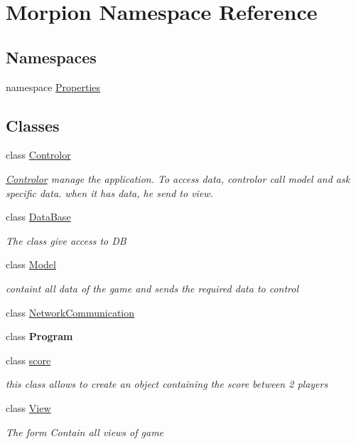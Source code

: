 \hypertarget{namespace_morpion}{}\section{Morpion Namespace Reference}
\label{namespace_morpion}
\subsection*{Namespaces}
\begin{DoxyCompactItemize}
\item 
namespace \hyperlink{namespace_morpion_1_1_properties}{Properties}
\end{DoxyCompactItemize}
\subsection*{Classes}
\begin{DoxyCompactItemize}
\item 
class \hyperlink{class_morpion_1_1_controlor}{Controlor}
\begin{DoxyCompactList}\small\item\em \hyperlink{class_morpion_1_1_controlor}{Controlor} manage the application. To access data, controlor call model and ask specific data. when it has data, he send to view. \end{DoxyCompactList}\item 
class \hyperlink{class_morpion_1_1_data_base}{Data\+Base}
\begin{DoxyCompactList}\small\item\em The class give access to DB \end{DoxyCompactList}\item 
class \hyperlink{class_morpion_1_1_model}{Model}
\begin{DoxyCompactList}\small\item\em containt all data of the game and sends the required data to control \end{DoxyCompactList}\item 
class \hyperlink{class_morpion_1_1_network_communication}{Network\+Communication}
\item 
class {\bfseries Program}
\item 
class \hyperlink{class_morpion_1_1score}{score}
\begin{DoxyCompactList}\small\item\em this class allows to create an object containing the score between 2 players \end{DoxyCompactList}\item 
class \hyperlink{class_morpion_1_1_view}{View}
\begin{DoxyCompactList}\small\item\em The form Contain all views of game \end{DoxyCompactList}\end{DoxyCompactItemize}
